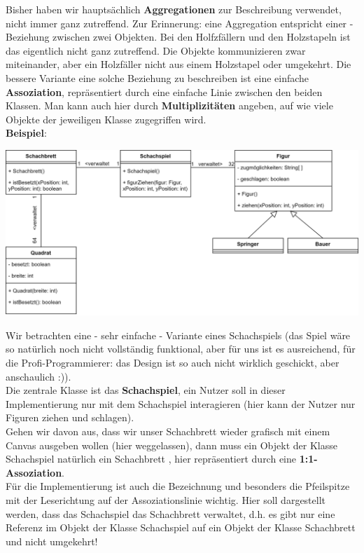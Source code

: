 \documentclass[fontsize=12pt]{article}
\begin{document}
Bisher haben wir hauptsächlich \textbf{Aggregationen} zur Beschreibung verwendet, nicht immer ganz zutreffend. Zur Erinnerung: eine Aggregation entspricht einer  - Beziehung zwischen zwei Objekten. Bei den Holfzfällern und den Holzstapeln ist das eigentlich nicht ganz zutreffend. Die Objekte kommunizieren zwar miteinander, aber ein Holzfäller  nicht aus einem Holzstapel oder umgekehrt. Die bessere Variante eine solche Beziehung zu beschreiben ist eine einfache \textbf{Assoziation}, repräsentiert durch eine einfache Linie zwischen den beiden Klassen. Man kann auch hier durch \textbf{Multiplizitäten} angeben, auf wie viele Objekte der jeweiligen Klasse zugegriffen wird. \\
\textbf{Beispiel}: 
\begin{center}
    \includegraphics[scale=0.18]{media/class_diagram_associations.png}
\end{center}
Wir betrachten eine - sehr einfache - Variante eines Schachspiels (das Spiel wäre so natürlich noch nicht vollständig funktional, aber für uns ist es ausreichend, für die Profi-Programmierer: das Design ist so auch nicht wirklich geschickt, aber anschaulich :)). \vspace{2mm}\\
Die zentrale Klasse ist das \textbf{Schachspiel}, ein Nutzer soll in dieser Implementierung nur mit dem Schachspiel interagieren (hier kann der Nutzer nur Figuren ziehen und schlagen).\vspace{2mm} \\
Gehen wir davon aus, dass wir unser Schachbrett wieder grafisch mit einem Canvas ausgeben wollen (hier weggelassen), dann muss ein Objekt der Klasse Schachspiel natürlich ein Schachbrett , hier repräsentiert durch eine \textbf{1:1-Assoziation}. \vspace{2mm} \\
Für die Implementierung ist auch die Bezeichnung und besonders die Pfeilspitze mit der Leserichtung auf der Assoziationslinie wichtig. Hier soll dargestellt werden, dass das Schachspiel das Schachbrett verwaltet, d.h. es gibt nur eine Referenz im Objekt der Klasse Schachspiel auf ein Objekt der Klasse Schachbrett und nicht umgekehrt!\vspace{2mm} \\
\end{document}
